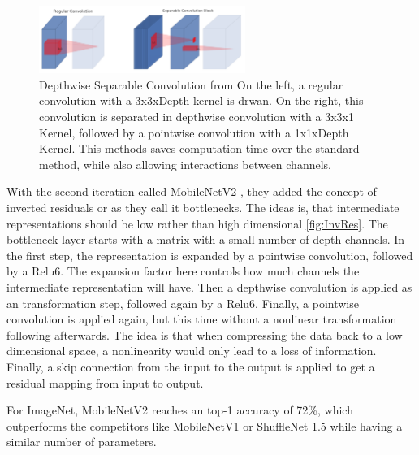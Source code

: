 \begin{figure}[h!]
    \centering
    \includegraphics[width=0.6\textwidth]{images/Depthwise_Separable_Convolution.png}
    \caption{Depthwise Separable Convolution from \cite[Page 3]{sandler2018mobilenetv2} \newline On the left,
     a regular convolution with a 3x3xDepth kernel is drwan. On the right, this
     convolution is separated in depthwise convolution with a 3x3x1 Kernel,
     followed by a pointwise convolution with a 1x1xDepth Kernel. This methods
     saves computation time over the standard method, while also allowing
     interactions between channels.}
     \label{fig:DSConv}
\end{figure}


With the second iteration called MobileNetV2 \cite{sandler2018mobilenetv2}, they
added the concept of inverted residuals or as they call it bottlenecks. The
ideas is, that intermediate representations should be low rather than high
dimensional \ref{fig:InvRes}. The bottleneck layer starts with a matrix with a
small number of depth channels. In the first step, the representation is
expanded by a pointwise convolution, followed by a Relu6. The expansion factor
here controls how much channels the intermediate representation will have. Then
a depthwise convolution is applied as an transformation step, followed again by
a Relu6. Finally, a pointwise convolution is applied again, but this time
without a nonlinear transformation following afterwards. The idea is that when
compressing the data back to a low dimensional space, a nonlinearity would only
lead to a loss of information. Finally, a skip connection from the input to the
output is applied to get a residual mapping from input to output.

For ImageNet, MobileNetV2 reaches an top-1 accuracy of 72\%, which outperforms
the competitors like MobileNetV1 or ShuffleNet 1.5 while having a similar number
of parameters.



